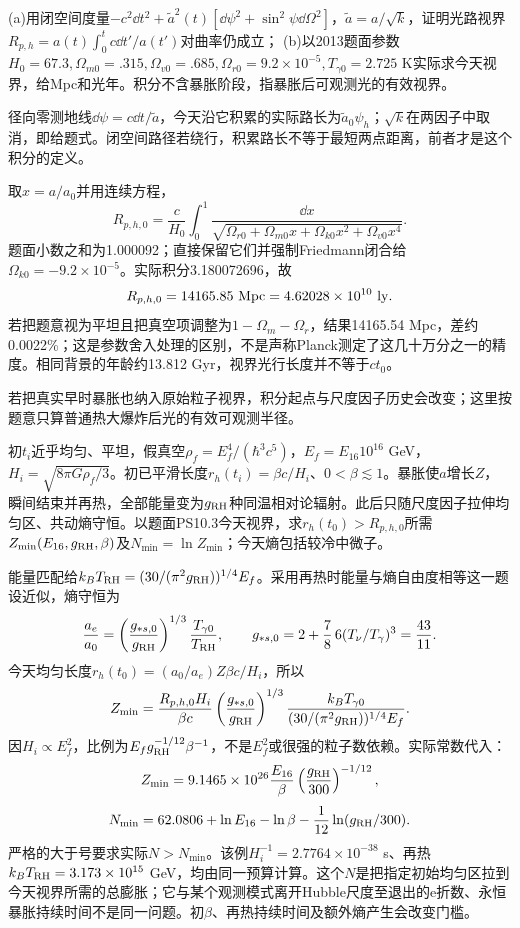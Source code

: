 \begin{exercise}
(a)用闭空间度量$-c^2\dd t^2+\tilde a^2(t)[\dd\psi^2+\sin^2\psi\dd\Omega^2]$，$\tilde a=a/\sqrt{k}$，证明光路视界$R_{p,h}=a(t)\int_0^tc\dd t'/a(t')$对曲率仍成立；
(b)以2013题面参数$H_0=67.3,\Omega_{m0}=.315,\Omega_{v0}=.685,\Omega_{r0}=9.2\times10^{-5},T_{\gamma0}=2.725$ K实际求今天视界，给Mpc和光年。积分不含暴胀阶段，指暴胀后可观测光的有效视界。
\end{exercise}
\begin{solution}
径向零测地线$\dd\psi=c\dd t/\tilde a$，今天沿它积累的实际路长为$\tilde a_0\psi_h$；$\sqrt{k}$在两因子中取消，即给题式。闭空间路径若绕行，积累路长不等于最短两点距离，前者才是这个积分的定义。

取$x=a/a_0$并用连续方程，
\[
 R_{p,h,0}=\frac c{H_0}\int_0^1
 \frac{\dd x}{\sqrt{\Omega_{r0}+\Omega_{m0}x+\Omega_{k0}x^2+\Omega_{v0}x^4}}.
\]
题面小数之和为1.000092；直接保留它们并强制Friedmann闭合给$\Omega_{k0}=-9.2\times10^{-5}$。实际积分3.180072696，故
\[
 R_{p,h,0}=14165.85\ {\rm Mpc}=4.62028\times10^{10}\ {\rm ly}.
\]
若把题意视为平坦且把真空项调整为$1-\Omega_m-\Omega_r$，结果14165.54 Mpc，差约0.0022\%；这是参数舍入处理的区别，不是声称Planck测定了这几十万分之一的精度。相同背景的年龄约13.812 Gyr，视界光行长度并不等于$ct_0$。

若把真实早时暴胀也纳入原始粒子视界，积分起点与尺度因子历史会改变；这里按题意只算普通热大爆炸后光的有效可观测半径。
\end{solution}

\begin{exercise}
初$t_i$近乎均匀、平坦，假真空$\rho_f=E_f^4/(\hbar^3c^5)$，$E_f=E_{16}10^{16}$ GeV，$H_i=\sqrt{8\pi G\rho_f/3}$。初已平滑长度$r_h(t_i)=\beta c/H_i$、$0<\beta\lesssim1$。暴胀使$a$增长$Z$，瞬间结束并再热，全部能量变为$g_{\rm RH}$种同温相对论辐射。此后只随尺度因子拉伸均匀区、共动熵守恒。以题面PS10.3今天视界，求$r_h(t_0)>R_{p,h,0}$所需$Z_{\min}(E_{16},g_{\rm RH},\beta)$及$N_{\min}=\ln Z_{\min}$；今天熵包括较冷中微子。
\end{exercise}
\begin{solution}
能量匹配给$k_BT_{\rm RH}=(30/(\pi^2g_{\rm RH}))^{1/4}E_f$。采用再热时能量与熵自由度相等这一题设近似，熵守恒为
\[
 \frac{a_e}{a_0}
 =\left(\frac{g_{*s,0}}{g_{\rm RH}}\right)^{1/3}
 \frac{T_{\gamma0}}{T_{\rm RH}},\qquad
 g_{*s,0}=2+\frac78\,6(T_\nu/T_\gamma)^3=\frac{43}{11}.
\]
今天均匀长度$r_h(t_0)=(a_0/a_e)Z\beta c/H_i$，所以
\[
 Z_{\min}=\frac{R_{p,h,0}H_i}{\beta c}
 \left(\frac{g_{*s,0}}{g_{\rm RH}}\right)^{1/3}
 \frac{k_BT_{\gamma0}}{(30/(\pi^2g_{\rm RH}))^{1/4}E_f}.
\]
因$H_i\propto E_f^2$，比例为$E_f g_{\rm RH}^{-1/12}\beta^{-1}$，不是$E_f^2$或很强的粒子数依赖。实际常数代入：
\[
 Z_{\min}=9.1465\times10^{26}
 \frac{E_{16}}{\beta}\left(\frac{g_{\rm RH}}{300}\right)^{-1/12},
\]
\[
 N_{\min}=62.0806+\ln E_{16}-\ln\beta
 -\frac1{12}\ln(g_{\rm RH}/300).
\]
严格的大于号要求实际$N>N_{\min}$。该例$H_i^{-1}=2.7764\times10^{-38}$ s、再热$k_BT_{\rm RH}=3.173\times10^{15}$ GeV，均由同一预算计算。这个$N$是把指定初始均匀区拉到今天视界所需的总膨胀；它与某个观测模式离开Hubble尺度至退出的e折数、永恒暴胀持续时间不是同一问题。初$\beta$、再热持续时间及额外熵产生会改变门槛。
\end{solution}
